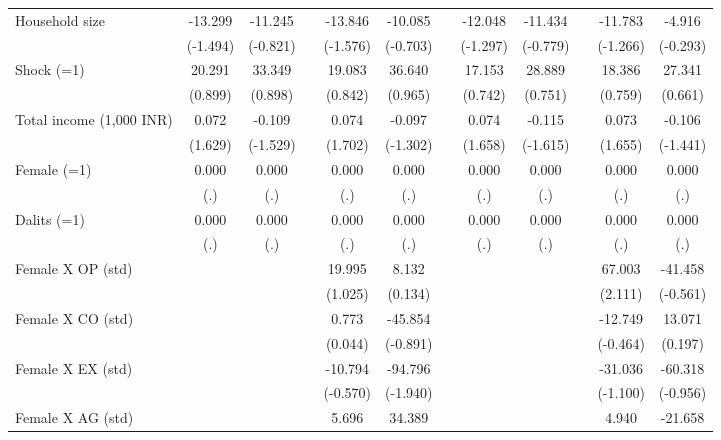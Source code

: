 {\begin{longtable}{@{\extracolsep{\fill}}lccccccccccc}
    Household size & -13.299 & -11.245 &       & -13.846 & -10.085 &       & -12.048 & -11.434 &       & -11.783 & -4.916 \\
          & (-1.494) & (-0.821) &       & (-1.576) & (-0.703) &       & (-1.297) & (-0.779) &       & (-1.266) & (-0.293) \\
    Shock (=1) & 20.291 & 33.349 &       & 19.083 & 36.640 &       & 17.153 & 28.889 &       & 18.386 & 27.341 \\
          & (0.899) & (0.898) &       & (0.842) & (0.965) &       & (0.742) & (0.751) &       & (0.759) & (0.661) \\
    Total income (1,000 INR) & 0.072 & -0.109 &       & 0.074 & -0.097 &       & 0.074 & -0.115 &       & 0.073 & -0.106 \\
          & (1.629) & (-1.529) &       & (1.702) & (-1.302) &       & (1.658) & (-1.615) &       & (1.655) & (-1.441) \\
    Female (=1) & 0.000 & 0.000 &       & 0.000 & 0.000 &       & 0.000 & 0.000 &       & 0.000 & 0.000 \\
          & (.)   & (.)   &       & (.)   & (.)   &       & (.)   & (.)   &       & (.)   & (.) \\
    Dalits (=1) & 0.000 & 0.000 &       & 0.000 & 0.000 &       & 0.000 & 0.000 &       & 0.000 & 0.000 \\
          & (.)   & (.)   &       & (.)   & (.)   &       & (.)   & (.)   &       & (.)   & (.) \\
    Female X OP (std) &       &       &       & 19.995 & 8.132 &       &       &       &       & 67.003 & -41.458 \\
          &       &       &       & (1.025) & (0.134) &       &       &       &       & (2.111) & (-0.561) \\
    Female X CO (std) &       &       &       & 0.773 & -45.854 &       &       &       &       & -12.749 & 13.071 \\
          &       &       &       & (0.044) & (-0.891) &       &       &       &       & (-0.464) & (0.197) \\
    Female X EX (std) &       &       &       & -10.794 & -94.796 &       &       &       &       & -31.036 & -60.318 \\
          &       &       &       & (-0.570) & (-1.940) &       &       &       &       & (-1.100) & (-0.956) \\
    Female X AG (std) &       &       &       & 5.696 & 34.389 &       &       &       &       & 4.940 & -21.658 \\

\end{longtable}}
